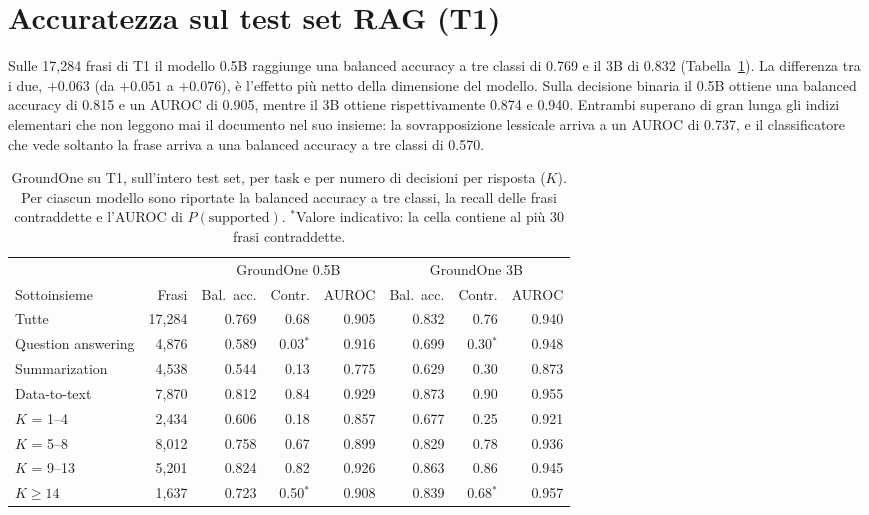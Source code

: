 \section{Accuratezza sul test set RAG (T1)}
\label{sec:results-t1}

Sulle 17{,}284 frasi di T1 il modello 0.5B raggiunge una balanced accuracy a tre classi di 0.769 e il 3B di 0.832
(Tabella~\ref{tab:results-t1}). La differenza tra i due, $+0.063$ (da $+0.051$ a $+0.076$), è l'effetto più netto della
dimensione del modello. Sulla decisione binaria il 0.5B ottiene una balanced accuracy di 0.815 e un AUROC di 0.905,
mentre il 3B ottiene rispettivamente 0.874 e 0.940. Entrambi superano di gran lunga gli indizi elementari che non leggono mai il documento nel suo insieme: la sovrapposizione lessicale arriva a un AUROC di 0.737, e il classificatore che vede
soltanto la frase arriva a una balanced accuracy a tre classi di 0.570.

\begin{table}[htbp]
\centering
\caption{GroundOne su T1, sull'intero test set, per task e per numero di decisioni per risposta ($K$). Per ciascun
modello sono riportate la balanced accuracy a tre classi, la recall delle frasi contraddette e l'AUROC di $P(\text{supported})$. $^{*}$Valore indicativo: la cella contiene al più 30 frasi contraddette.}
\label{tab:results-t1}
\small
\begin{adjustbox}{max width=\textwidth}
\begin{tabular}{@{}lrrrrrrr@{}}
\toprule
 & & \multicolumn{3}{c}{GroundOne 0.5B} & \multicolumn{3}{c}{GroundOne 3B} \\
\cmidrule(lr){3-5}\cmidrule(l){6-8}
Sottoinsieme & Frasi & Bal.\ acc. & Contr. & AUROC & Bal.\ acc. & Contr. & AUROC \\
\midrule
Tutte & 17{,}284 & 0.769 & 0.68 & 0.905 & 0.832 & 0.76 & 0.940 \\
\midrule
Question answering & 4{,}876 & 0.589 & 0.03$^{*}$ & 0.916 & 0.699 & 0.30$^{*}$ & 0.948 \\
Summarization & 4{,}538 & 0.544 & 0.13 & 0.775 & 0.629 & 0.30 & 0.873 \\
Data-to-text & 7{,}870 & 0.812 & 0.84 & 0.929 & 0.873 & 0.90 & 0.955 \\
\midrule
$K$ = 1--4 & 2{,}434 & 0.606 & 0.18 & 0.857 & 0.677 & 0.25 & 0.921 \\
$K$ = 5--8 & 8{,}012 & 0.758 & 0.67 & 0.899 & 0.829 & 0.78 & 0.936 \\
$K$ = 9--13 & 5{,}201 & 0.824 & 0.82 & 0.926 & 0.863 & 0.86 & 0.945 \\
$K \geq 14$ & 1{,}637 & 0.723 & 0.50$^{*}$ & 0.908 & 0.839 & 0.68$^{*}$ & 0.957 \\
\bottomrule
\end{tabular}
\end{adjustbox}
\end{table}

